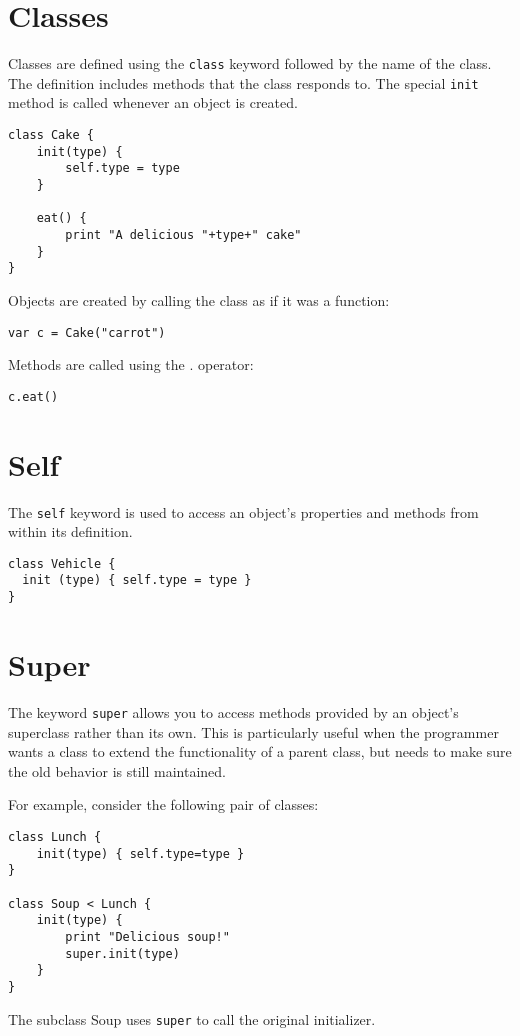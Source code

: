 \hypertarget{classes}{%
\section{Classes}\label{classes}}

Classes are defined using the \texttt{class} keyword followed by the
name of the class. The definition includes methods that the class
responds to. The special \texttt{init} method is called whenever an
object is created.

\begin{lstlisting}
class Cake {
    init(type) {
        self.type = type
    }

    eat() {
        print "A delicious "+type+" cake"
    }
}
\end{lstlisting}

Objects are created by calling the class as if it was a function:

\begin{lstlisting}
var c = Cake("carrot")
\end{lstlisting}

Methods are called using the . operator:

\begin{lstlisting}
c.eat()
\end{lstlisting}

\hypertarget{self}{%
\section{Self}\label{self}}

The \texttt{self} keyword is used to access an object's properties and
methods from within its definition.

\begin{lstlisting}
class Vehicle {
  init (type) { self.type = type }
}
\end{lstlisting}

\hypertarget{super}{%
\section{Super}\label{super}}

The keyword \texttt{super} allows you to access methods provided by an
object's superclass rather than its own. This is particularly useful
when the programmer wants a class to extend the functionality of a
parent class, but needs to make sure the old behavior is still
maintained.

For example, consider the following pair of classes:

\begin{lstlisting}
class Lunch {
    init(type) { self.type=type }
}

class Soup < Lunch {
    init(type) {
        print "Delicious soup!"
        super.init(type)
    }
}
\end{lstlisting}

The subclass Soup uses \texttt{super} to call the original initializer.
